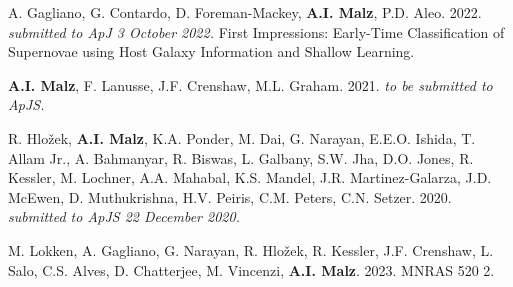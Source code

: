 \begin{list}{\pubnumber{\therefpubnum}}{\malzlist}

\item A. Gagliano, G. Contardo, D. Foreman-Mackey, {\bf A.I. Malz}, P.D. Aleo. 2022. {\em submitted to ApJ 3 October 2022.} First Impressions: Early-Time Classification of Supernovae using Host Galaxy Information and Shallow Learning.
  
\item {\bf A.I. Malz}, F. Lanusse, J.F. Crenshaw, M.L. Graham. 2021. {\em to be submitted to ApJS.} 
	
\item R. Hlo{\v z}ek, {\bf A.I. Malz}, K.A. Ponder, M. Dai, G. Narayan, E.E.O. Ishida,%
 T. Allam Jr., A. Bahmanyar, R. Biswas, L. Galbany, S.W. Jha, D.O. Jones, R. Kessler, M. Lochner, A.A. Mahabal, K.S. Mandel, J.R. Martinez-Galarza, J.D. McEwen, D. Muthukrishna, H.V. Peiris, C.M. Peters, C.N. Setzer. 2020. {\em submitted to ApJS 22 December 2020.} 

\item  M. Lokken, A. Gagliano, G. Narayan, R. Hlo{\v z}ek, R. Kessler, J.F. Crenshaw, L. Salo, C.S. Alves, D. Chatterjee, M. Vincenzi, {\bf A.I. Malz}. 2023. MNRAS 520 2. 


\end{list}
